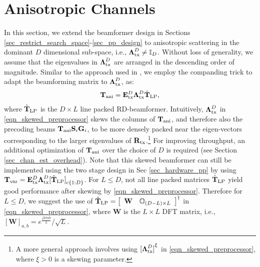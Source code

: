 \documentclass[journal,comsoc]{IEEEtran}
\begin{document}
\section{Anisotropic Channels} \label{sec_anisotropy}
%
In this section, we extend the beamformer design in Sections \ref{sec_restrict_search_space}-\ref{sec_pp_design} to anisotropic scattering in the dominant $D$ dimensional sub-space, i.e., $\boldsymbol{\Lambda}_{\rm tx}^{D} \neq \mathbb{I}_D$. Without loss of generality, we assume that the eigenvalues in $\boldsymbol{\Lambda}_{\rm tx}^{D}$ are arranged in the descending order of magnitude. Similar to the approach used in \cite{Love_beamforming_correlated, Xia2006, Raghavan_RVQ}, we employ the companding trick to adapt the beamforming matrix to $\boldsymbol{\Lambda}_{\rm tx}^{D}$, as:
\begin{eqnarray}
\mathbf{T}_{\rm ani} = \mathbf{E}^D_{\rm tx} {\boldsymbol{\Lambda}^{D}_{\rm tx}} \hat{\mathbf{T}}_{\rm LP}, \label{eqn_skewed_preprocessor}
\end{eqnarray}
where $\hat{\mathbf{T}}_{\rm LP}$ is the $D \times L$ line packed RD-beamformer. Intuitively, $\boldsymbol{\Lambda}^{D}_{\rm tx}$ in \eqref{eqn_skewed_preprocessor} skews the columns of $\mathbf{T}_{\rm ani}$, and therefore also the precoding beams $\mathbf{T}_{\rm ani} \mathbf{S}_i \mathbf{G}_i$, to be more densely packed near the eigen-vectors corresponding to the larger eigenvalues of $\mathbf{R}_{\rm tx}$.\footnote{A more general approach involves using ${[\boldsymbol{\Lambda}^{D}_{\rm tx}]}^{\xi}$ in \eqref{eqn_skewed_preprocessor}, where $\xi > 0$ is a skewing parameter.} 
For improving throughput, an additional optimization of $\mathbf{T}_{\rm ani}$ over the choice of $D$ is required (see Section \ref{sec_chan_est_overhead}). 
Note that this skewed beamformer can still be implemented using the two stage design in Sec \ref{sec_hardware_pp} by using $\mathbf{T}_{\rm var} = \mathbf{E}_{\rm tx}^{D} \boldsymbol{\Lambda}_{\rm tx}^{D} {[\hat{\mathbf{T}}_{\rm LP}]}_{{\rm c}\{1:D\}}$. 
%
For $L \leq D$, not all line packed matrices $\hat{\mathbf{T}}_{\rm LP}$ yield good performance after skewing by \eqref{eqn_skewed_preprocessor}. Therefore for $L \leq D$, we suggest the use of $\hat{\mathbf{T}}_{\rm LP} = { \left[ \begin{array}{cc} \mathbf{W} & \mathbb{O}_{(D-L)\times L} \end{array} \right]}^{\dag}$ in \eqref{eqn_skewed_preprocessor}, where $\mathbf{W}$ is the $L\times L$ DFT matrix, i.e., ${[\mathbf{W}]}_{a,b} = e^{\frac{j2\pi a b}{L}}/\sqrt{L}$. 
%
\end{document}
